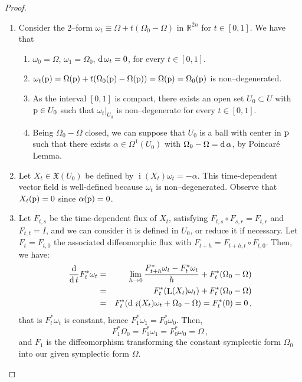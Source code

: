 \documentclass[12pt]{report}
\def\qed{\ifvmode\removelastskip\fi
{\unskip\nobreak\hfil\penalty50\hbox{}\nobreak\hfil
\hbox{\vrule height1.2ex width1.2ex}\parfillskip=0pt
\finalhyphendemerits=0 \par\smallskip}}
\def\vf{\mathfrak X}
\def\d{{\rm d}}
\def\Real{\mathbb{R}}
\def\Lie{\mathop{\rm L}\nolimits}
\def\inn{\mathop{i}\nolimits}
\begin{document}
\begin{proof}
\begin{enumerate}
\item Consider the 2--form $\omega_{t}\equiv\Omega+t(\Omega_{0}-\Omega)$ in $\Real^{2n}$ for $t\in[0,1]$. We have that
\begin{enumerate}
\item $\omega_{0}=\Omega$, $\omega_{1}=\Omega_{0}$, $\d\,\omega_{t}=0$, for every $t\in[0,1]$.
\item $\omega_{t}({\rm p})=\Omega({\rm p})+t(\Omega_{0}({\rm p})-\Omega({\rm p}))=\Omega({\rm p})=\Omega_{0}({\rm p})$ is non--degenerated.
\item As the interval $[0,1]$ is compact, there exists an open set $U_{0}\subset U$  with ${\rm p}\in U_{0}$ such that $\left.\omega_{t}\right|_{U_{0}}$ is non--degenerate for every $t\in[0,1]$.
\item Being $\Omega_{0}-\Omega$ closed,  we can suppose that $U_{0}$ is a ball with center in ${\rm p}$ such that there exists $\alpha\in\Omega^{1}(U_{0})$ with $\Omega_{0}-\Omega=\d\,\alpha$, by Poincar\'e Lemma.
\end{enumerate}
\item Let $X_{t}\in\vf(U_{0})$ be defined by $\inn (X_t)\omega_t=-\alpha$. This time-dependent vector field is well-defined because $\omega_t$ is non--degenerated. Observe that $X_t({\rm p})=0$ since  $\alpha({\rm p})=0$.
\item Let $F_{t,s}$ be the time-dependent flux of $X_{t}$, satisfying $F_{t,s}\circ F_{s,r}=F_{t,r}$ and $F_{t,t}=I$, and we can consider it is defined in $U_{0}$, or reduce it if necessary. Let $F_{t}=F_{t,0}$ the associated diffeomorphic flux with $F_{t+h}=F_{t+h,t}\circ F_{t,0}$. Then, we have:
\begin{eqnarray*}
\frac{\d}{\d\, t}F_{t}^{*}\omega_{t} &=& 
\lim_{h\to 0}\frac{F_{t+h}^{*}\omega_{t}  -F_{t}^{*}\omega_{t}}{h}+F_{t}^{*}(\Omega_{0}-\Omega)\\
&=&F_{t}^{*}( \Lie(X_{t})\omega_{t} )+F_{t}^{*}(\Omega_{0}-\Omega)\\
&=&F_{t}^{*}(\d\, \inn (X_t)\omega_t +\Omega_{0}-\Omega)
=F_{t}^{*}(0)=0\,,
\end{eqnarray*}
that is $F_{t}^{*}\omega_{t}$ is constant, hence $F_{1}^{*}\omega_{1}=F_{0}^{*}\omega_{0}$. Then,
$$
F_{1}^{*}\Omega_{0}=F_{1}^{*}\omega_{1}=F_{0}^{*}\omega_{0}=\Omega\, ,
$$
and $F_{1}$ is the diffeomorphism transforming the constant symplectic form $\Omega_{0}$ into 
our given symplectic form 
$\Omega$.
\end{enumerate}
\qed  \end{proof}
\end{document}

